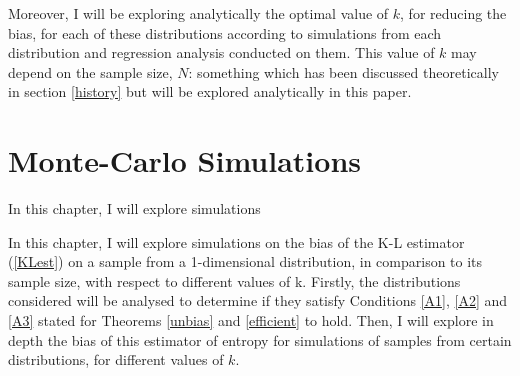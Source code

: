 \documentclass[12pt]{report}
\begin{document}
Moreover, I will be exploring analytically the optimal value of $k$, for reducing the bias, for each of these distributions according to simulations from each distribution and regression analysis conducted on them. This value of $k$ may depend on the sample size, $N$: something which has been discussed theoretically in section \ref{history} but will be explored analytically in this paper.











\chapter{Monte-Carlo Simulations} \label{Chapter_simulations}

In this chapter, I will explore simulations 

In this chapter, I will explore simulations on the bias of the K-L estimator (\ref{KLest}) on a sample from a 1-dimensional distribution, in comparison to its sample size, with respect to different values of k. Firstly, the distributions considered will be analysed to determine if they satisfy Conditions \ref{A1}, \ref{A2} and \ref{A3} stated for Theorems \ref{unbias} and \ref{efficient} to hold. Then, I will explore in depth the bias of this estimator of entropy for simulations of samples from certain distributions, for different values of $k$.
\end{document}
